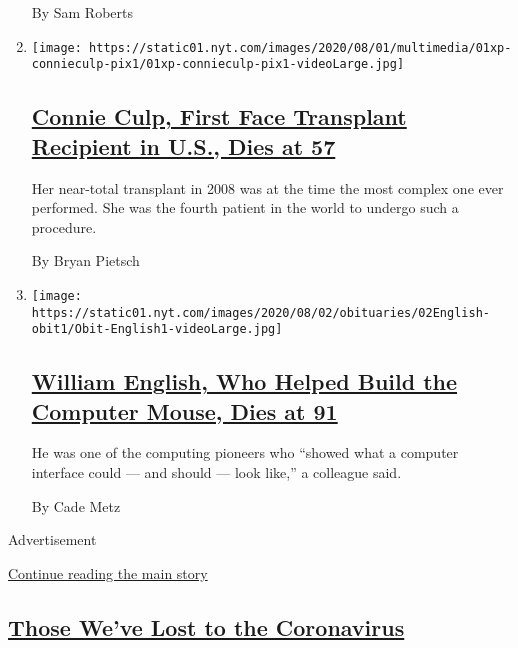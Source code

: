 \begin{enumerate}
  By Sam Roberts
\item
  \texttt{[image: https://static01.nyt.com/images/2020/08/01/multimedia/01xp-connieculp-pix1/01xp-connieculp-pix1-videoLarge.jpg]}

  \hypertarget{connie-culp-first-face-transplant-recipient-in-us-dies-at-57}{%
  \subsection{\texorpdfstring{\href{/2020/08/01/us/Connie-culp-dead-face-transplant.html}{Connie
  Culp, First Face Transplant Recipient in U.S., Dies at
  57}}{Connie Culp, First Face Transplant Recipient in U.S., Dies at 57}}\label{connie-culp-first-face-transplant-recipient-in-us-dies-at-57}}

  Her near-total transplant in 2008 was at the time the most complex one
  ever performed. She was the fourth patient in the world to undergo
  such a procedure.

  By Bryan Pietsch
\item
  \texttt{[image: https://static01.nyt.com/images/2020/08/02/obituaries/02English-obit1/Obit-English1-videoLarge.jpg]}

  \hypertarget{william-english-who-helped-build-the-computer-mouse-dies-at-91}{%
  \subsection{\texorpdfstring{\href{/2020/07/31/technology/william-english-who-helped-build-the-computer-mouse-dies-at-91.html}{William
  English, Who Helped Build the Computer Mouse, Dies at
  91}}{William English, Who Helped Build the Computer Mouse, Dies at 91}}\label{william-english-who-helped-build-the-computer-mouse-dies-at-91}}

  He was one of the computing pioneers who ``showed what a computer
  interface could --- and should --- look like,'' a colleague said.

  By Cade Metz
\end{enumerate}

Advertisement

\protect\hyperlink{after-mid1}{Continue reading the main story}

\hypertarget{those-weve-lost-to-the-coronavirus}{%
\subsection{\texorpdfstring{\href{/series/people-died-coronavirus-obituaries}{Those
We've Lost to the
Coronavirus}}{Those We've Lost to the Coronavirus}}\label{those-weve-lost-to-the-coronavirus}}

